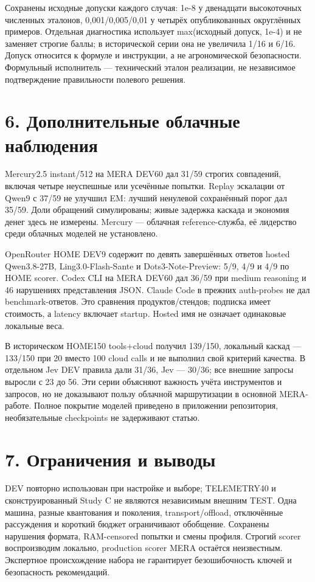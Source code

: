 \documentclass[14pt,a4paper]{extarticle}
\begin{document}
Сохранены исходные допуски каждого случая: 1e-8 у двенадцати высокоточных численных эталонов, 0,001/0,005/0,01 у четырёх опубликованных округлённых примеров. Отдельная диагностика использует max(исходный допуск, 1e-4) и не заменяет строгие баллы; в исторической серии она не увеличила 1/16 и 6/16. Допуск относится к формуле и инструкции, а не агрономической безопасности. Формульный исполнитель --- технический эталон реализации, не независимое подтверждение правильности полевого решения.


\section*{6. Дополнительные облачные наблюдения}

Mercury2.5 instant/512 на MERA DEV60 дал 31/59 строгих совпадений, включая четыре неуспешные или усечённые попытки. Replay эскалации от Qwen9 с 37/59 не улучшил EM: лучший ненулевой сохранённый порог дал 35/59. Доли обращений симулированы; живые задержка каскада и экономия денег здесь не измерены. Mercury --- облачная reference-служба, её лидерство среди облачных моделей не установлено.


OpenRouter HOME DEV9 содержит по девять завершённых ответов hosted Qwen3.8-27B, Ling3.0-Flash-Sante и Dots3-Note-Preview: 5/9, 4/9 и 4/9 по HOME scorer. Codex CLI на MERA DEV60 дал 36/59 при medium reasoning и 46 нарушениях представления JSON. Claude Code в прежних auth-probes не дал benchmark-ответов. Это сравнения продуктов/стендов; подписка имеет стоимость, а latency включает startup. Hosted имя не означает одинаковые локальные веса.


В историческом HOME150 tools+cloud получил 139/150, локальный каскад --- 133/150 при 20 вместо 100 cloud calls и не выполнил свой критерий качества. В отдельном Jev DEV правила дали 31/36, Jev --- 30/36; все внешние запросы выросли с 23 до 56. Эти серии объясняют важность учёта инструментов и запросов, но не доказывают пользу облачной маршрутизации в основной MERA-работе. Полное покрытие моделей приведено в приложении репозитория, необязательные checkpoints не задерживают статью.


\section*{7. Ограничения и выводы}

DEV повторно использован при настройке и выборе; TELEMETRY40 и сконструированный Study C не являются независимым внешним TEST. Одна машина, разные квантования и поколения, transport/offload, отключённые рассуждения и короткий бюджет ограничивают обобщение. Сохранены нарушения формата, RAM-censored попытки и смены профиля. Строгий scorer воспроизводим локально, production scorer MERA остаётся неизвестным. Экспертное происхождение набора не гарантирует безошибочность ключей и безопасность рекомендаций.
\end{document}
